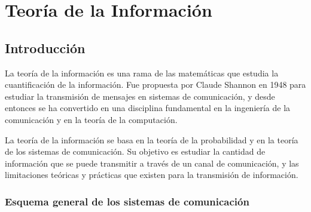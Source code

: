 \section{Teoría de la Información}\label{teoruxeda-de-la-informaciuxf3n}



\subsection{Introducción}\label{introducciuxf3n-teoria-informacion}

La teoría de la información es una rama de las matemáticas que estudia
la cuantificación de la información. Fue propuesta por Claude Shannon en
1948 para estudiar la transmisión de mensajes en sistemas de
comunicación, y desde entonces se ha convertido en una disciplina
fundamental en la ingeniería de la comunicación y en la teoría de la
computación.

La teoría de la información se basa en la teoría de la probabilidad y en
la teoría de los sistemas de comunicación. Su objetivo es estudiar la
cantidad de información que se puede transmitir a través de un canal de
comunicación, y las limitaciones teóricas y prácticas que existen para
la transmisión de información.

\subsubsection{Esquema general de los sistemas de
comunicación}\label{esquema-general-de-los-sistemas-de-comunicaciuxf3n}

\begin{figure}[htbp!]
\centering

\end{figure}

